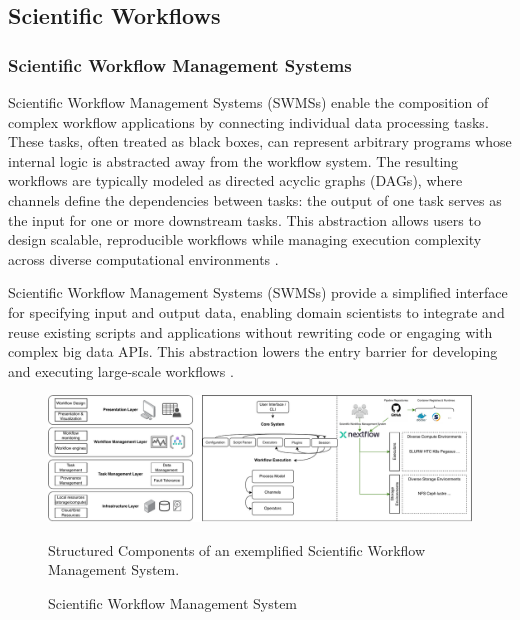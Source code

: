 \subsection{Scientific Workflows}
\label{sec:background_workflows}

\subsubsection{Scientific Workflow Management Systems}
\label{sec:background_workflows_swms}
Scientific Workflow Management Systems (SWMSs) enable the composition of complex workflow applications by connecting individual data processing tasks. These tasks, often treated as black boxes, can represent arbitrary programs whose internal logic is abstracted away from the workflow system. The resulting workflows are typically modeled as directed acyclic graphs (DAGs), where channels define the dependencies between tasks: the output of one task serves as the input for one or more downstream tasks. This abstraction allows users to design scalable, reproducible workflows while managing execution complexity across diverse computational environments \cite{thamsen2025energyawareworkflowexecutionoverview}.

Scientific Workflow Management Systems (SWMSs) provide a simplified interface for specifying input and output data, enabling domain scientists to integrate and reuse existing scripts and applications without rewriting code or engaging with complex big data APIs. This abstraction lowers the entry barrier for developing and executing large-scale workflows \cite{Bader_2022}.

\begin{figure}[H]
    \centering
    \includegraphics[scale=0.45]{fig/02/02-swms.pdf}
    \caption{Scientific Workflow Management System}
    \label{fig:02-swms}
    \tiny
    Structured Components of an exemplified Scientific Workflow Management System.
\end{figure}

